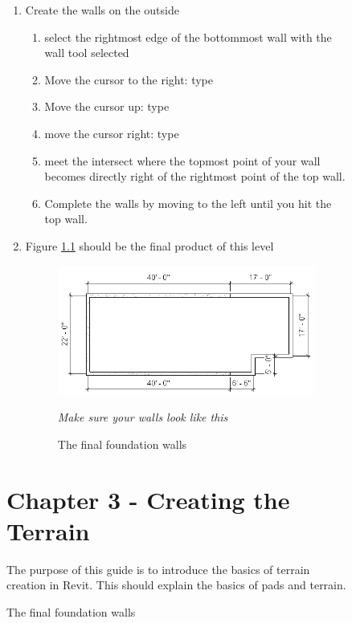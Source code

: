 \documentclass{tufte-book} %
\begin{document}
\begin{figure}
\begin{enumerate}
	\item Create the walls on the outside
	\begin{enumerate}
		\item select the rightmost edge of the bottommost wall with the wall tool selected
		\item Move the cursor to the right: type 
		\item Move the cursor up: type 
		\item move the cursor right: type 
		\item meet the intersect where the topmost point of your wall becomes directly right of the rightmost point of the top wall.
		\item Complete the walls by moving to the left until you hit the top wall.
	\end{enumerate}
	\item Figure \ref{fig:revfoundfinal} should be the final product of this level
	
	\begin{figure}
		\includegraphics[width=\linewidth]{revitfoundationfinal.png}
		\caption[Revit foundation and retaining walls]{The final foundation walls}
		\emph{Make sure your walls  look like this}
		\label{fig:revfoundfinal}
	\end{figure}
\end{enumerate}

%
%


\chapter{Chapter 3 - Creating the Terrain}
\label{ch:3}
The purpose of this guide is to introduce the basics of terrain creation in Revit. This should explain the basics of pads and terrain.

\end{figure}
\end{document}
